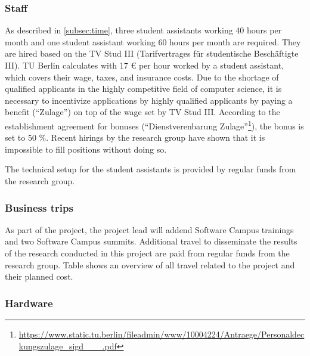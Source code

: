 \subsubsection{Staff}

As described in \cref{subsec:time}, three student assistants working 40 hours per month and one student assistant working 60 hours per month are required.
They are hired based on the TV Stud III (Tarifvertrages für studentische Beschäftigte III).
TU Berlin calculates with 17 € per hour worked by a student assistant, which covers their wage, taxes, and insurance costs.
Due to the shortage of qualified applicants in the highly competitive field of computer science, it is necessary to incentivize applications by highly qualified applicants by paying a benefit (\enquote{Zulage}) on top of the wage set by TV Stud III.
According to the establishment agreement for bonuses (\enquote{Dienstverenbarung Zulage}\footnote{\url{https://www.static.tu.berlin/fileadmin/www/10004224/Antraege/Personaldeckungszulage_sigd___.pdf}}), the bonus is set to 50 \%.
Recent hirings by the research group have shown that it is impossible to fill positions without doing so.

The technical setup for the student assistants is provided by regular funds from the research group.

\subsubsection{Business trips}

As part of the project, the project lead will addend Software Campus trainings and two Software Campus summits.
Additional travel to disseminate the results of the research conducted in this project are paid from regular funds from the research group.
Table  shows an overview of all travel related to the project and their planned cost.

\subsubsection{Hardware}


